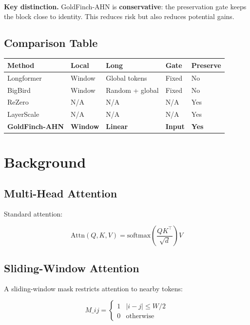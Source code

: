 \textbf{Key distinction.} GoldFinch-AHN is \textbf{conservative}: the preservation 
gate keeps the block close to identity. This reduces risk but also reduces 
potential gains.



\subsection{Comparison Table}

\begin{table}[H]
\centering
\small
\begin{tabular}{lllll}
\toprule
\textbf{Method} & \textbf{Local} & \textbf{Long} & \textbf{Gate} & \textbf{Preserve} \\
\midrule
Longformer & Window & Global tokens & Fixed & No \\
BigBird & Window & Random + global & Fixed & No \\
ReZero & N/A & N/A & N/A & Yes \\
LayerScale & N/A & N/A & N/A & Yes \\
\textbf{GoldFinch-AHN} & \textbf{Window} & \textbf{Linear} & \textbf{Input} & \textbf{Yes} \\
\bottomrule
\end{tabular}
\end{table}




\section{Background}

\subsection{Multi-Head Attention}

Standard attention:

\[
\text{Attn}(Q, K, V) = \text{softmax}\!\left(\frac{QK^\top}{\sqrt{d}}\right)V
\tag{3.1}
\]

\subsection{Sliding-Window Attention}

A sliding-window mask restricts attention to nearby tokens:

\[
M\_{ij} = \begin{cases} 1 & |i - j| \leq W/2 \\ 0 & \text{otherwise} \end{cases}
\tag{3.2}
\]

